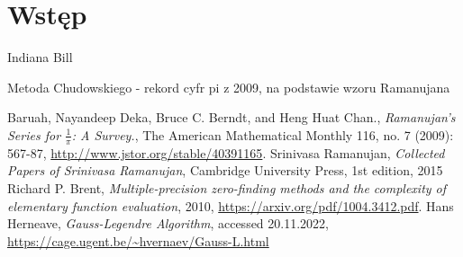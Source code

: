 \documentclass[11pt, wide, leqno]{mwart}
\begin{document}
\maketitle
\tableofcontents

\section{Wstęp}\label{sec:ws}

Indiana Bill

Metoda Chudowskiego - rekord cyfr pi z 2009, na podstawie wzoru Ramanujana









\koniec

\begin{thebibliography}{69}
        Baruah, Nayandeep Deka, Bruce C. Berndt, and Heng Huat Chan.,
        \textit{Ramanujan's Series for $\frac1\pi$: A Survey.}, 
        The American Mathematical Monthly 116, no. 7 (2009): 567-87,
        \url{http://www.jstor.org/stable/40391165}.
        Srinivasa Ramanujan,
        \textit{Collected Papers of Srinivasa Ramanujan}, 
        Cambridge University Press,
        1st edition,
        2015
        Richard P. Brent,
        \textit{Multiple-precision zero-finding methods and the complexity of elementary function evaluation},
        2010,
        \url{https://arxiv.org/pdf/1004.3412.pdf}.
        Hans Herneave,
        \textit{Gauss-Legendre Algorithm},
        accessed 20.11.2022,
        \url{https://cage.ugent.be/~hvernaev/Gauss-L.html}
\end{thebibliography}
\end{document}
